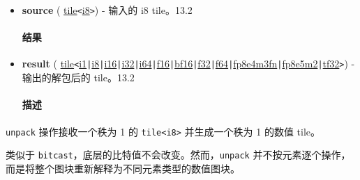 \documentclass{article}
\begin{document}
\begin{itemize}
\item \textbf{source} ( \href{https://docs.nvidia.com/cuda/tile-ir/latest/sections/types.html#type-tile}{tile}\texttt{<}\href{https://docs.nvidia.com/cuda/tile-ir/latest/sections/types.html#subsection-element-types}{i8}\texttt{>}) - 输入的 i8 tile。13.2


\paragraph{结果}

\item \textbf{result} ( \href{https://docs.nvidia.com/cuda/tile-ir/latest/sections/types.html#type-tile}{tile}\texttt{<}\href{https://docs.nvidia.com/cuda/tile-ir/latest/sections/types.html#subsection-element-types}{i1}\texttt{|}\href{https://docs.nvidia.com/cuda/tile-ir/latest/sections/types.html#subsection-element-types}{i8}\texttt{|}\href{https://docs.nvidia.com/cuda/tile-ir/latest/sections/types.html#subsection-element-types}{i16}\texttt{|}\href{https://docs.nvidia.com/cuda/tile-ir/latest/sections/types.html#subsection-element-types}{i32}\texttt{|}\href{https://docs.nvidia.com/cuda/tile-ir/latest/sections/types.html#subsection-element-types}{i64}\texttt{|}\href{https://docs.nvidia.com/cuda/tile-ir/latest/sections/types.html#subsection-element-types}{f16}\texttt{|}\href{https://docs.nvidia.com/cuda/tile-ir/latest/sections/types.html#subsection-element-types}{bf16}\texttt{|}\href{https://docs.nvidia.com/cuda/tile-ir/latest/sections/types.html#subsection-element-types}{f32}\texttt{|}\href{https://docs.nvidia.com/cuda/tile-ir/latest/sections/types.html#subsection-element-types}{f64}\texttt{|}\href{https://docs.nvidia.com/cuda/tile-ir/latest/sections/types.html#subsection-element-types}{fp8e4m3fn}\texttt{|}\href{https://docs.nvidia.com/cuda/tile-ir/latest/sections/types.html#subsection-element-types}{fp8e5m2}\texttt{|}\href{https://docs.nvidia.com/cuda/tile-ir/latest/sections/types.html#subsection-element-types}{tf32}\texttt{>}) - 输出的解包后的 tile。13.2


\paragraph{描述}

\end{itemize}
\texttt{unpack} 操作接收一个秩为 1 的 \texttt{tile<i8>} 并生成一个秩为 1 的数值 tile。


类似于 \texttt{bitcast}，底层的比特值不会改变。然而，\texttt{unpack} 并不按元素逐个操作，而是将整个图块重新解释为不同元素类型的数值图块。
\end{document}
